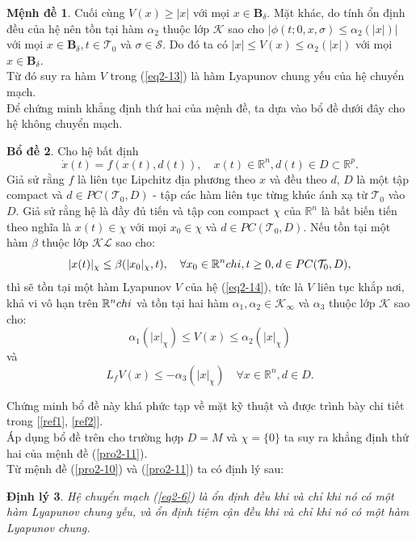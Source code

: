 \documentclass[14pt,a4paper,oneside]{report}		%
\newtheorem{theorem}{Định lý}[chapter]\theoremstyle{definition}
\newtheorem{lemma}[theorem]{Bổ đề}
\newtheorem{proposition}[theorem]{Mệnh đề}
\begin{document}
\begin{proposition}
Cuối cùng $V(x)\geq |x|$ với mọi $x\in\mathbf{B}_\delta$. Mặt khác, do tính ổn định đều của hệ nên tồn tại hàm $\alpha_2$ thuộc lớp $\mathcal{K}$ sao cho $|\phi(t;0,x,\sigma)\leq\alpha_2(|x|)|$ với mọi $x\in\mathbf{B}_\delta, t\in\mathcal{T}_0$ và $\sigma\in\mathcal{S}$. Do đó ta có $|x|\leq V(x)\leq\alpha_2(|x|)$ với mọi $x\in\mathbf{B}_\delta$.\\
Từ đó suy ra hàm $V$ trong (\ref{eq2-13}) là hàm Lyapunov chung yếu của hệ chuyển mạch.\\

Để chứng minh khẳng định thứ hai của mệnh đề, ta dựa vào bổ đề dưới đây cho hệ không chuyển mạch.
\end{proposition}
\begin{lemma}
Cho hệ bất định
\begin{equation} \label{eq2-14}
\dot{x}(t)=f(x(t),d(t)),\quad x(t)\in\mathbb{R}^n,d(t)\in D\subset\mathbb{R}^p.
\end{equation}
Giả sử rằng $f$ là liên tục Lipchitz địa phương theo $x$ và đều theo $d$, $D$ là một tập compact và $d\in PC(\mathcal{T}_0,D)$ - tập các hàm liên tục từng khúc ánh xạ từ $\mathcal{T}_0$ vào $D$. Giả sử rằng hệ là đầy đủ tiến và tập con compact $\chi$ của $\mathbb{R}^n$ là bất biến tiến theo nghĩa là $x(t) \in \chi$ với mọi $x_0\in\chi$ và $d\in PC(\mathcal{T}_0,D)$. Nếu tồn tại một hàm $\beta$ thuộc lớp $\mathcal{KL}$ sao cho:
\begin{equation} \label{eq2-15}
|x(t)|_\chi \leq\beta(|x_0|_\chi,t),\quad\forall x_0\in\mathbb{R}^n\\chi, t\geq 0,d\in PC(\mathcal{T}_0,D),
\end{equation}
thì sẽ tồn tại một hàm Lyapunov $V$ của hệ (\ref{eq2-14}), tức là $V$ liên tục khắp nơi, khả vi vô hạn trên $\mathbb{R}^n\\chi$ và tồn tại hai hàm $\alpha_1,\alpha_2\in\mathcal{K}_\infty$ và $\alpha_3$ thuộc lớp $\mathcal{K}$ sao cho:
$$\alpha_1(|x|_\chi)\leq V(x)\leq\alpha_2(|x|_\chi)$$
và
$$L_fV(x)\leq -\alpha_3(|x|_\chi) \quad \forall x\in\mathbb{R}^n,d\in D.$$
\end{lemma}

Chứng minh bổ đề này khá phức tạp về mặt kỹ thuật và được trình bày chi tiết trong [\ref{ref1}, \ref{ref2}].\\
Áp dụng bổ đề trên cho trường hợp $D=M$ và $\chi=\{0\}$ ta suy ra khẳng định thứ hai của mệnh đề (\ref{pro2-11}).\\

Từ mệnh đề (\ref{pro2-10}) và (\ref{pro2-11}) ta có định lý sau:
\begin{theorem} \label{th2-10}
Hệ chuyển mạch (\ref{eq2-6}) là ổn định đều khi và chỉ khi nó có một hàm Lyapunov chung yếu, và ổn định tiệm cận đều khi và chỉ khi nó có một hàm Lyapunov chung.
\end{theorem}
\end{document}
